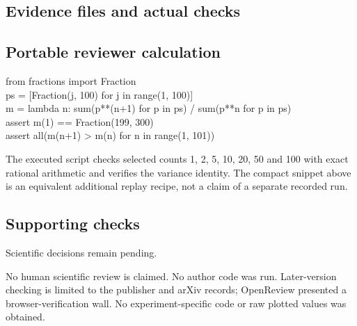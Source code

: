\documentclass[10pt]{article}
\begin{document}
\subsection*{Evidence files and actual checks}
\subsection*{Portable reviewer calculation}
{\ttfamily\footnotesize from fractions import Fraction\\
ps = [Fraction(j, 100) for j in range(1, 100)]\\
m = lambda n: sum(p**(n+1) for p in ps) / sum(p**n for p in ps)\\
assert m(1) == Fraction(199, 300)\\
assert all(m(n+1) > m(n) for n in range(1, 101))}\par
The executed script checks selected counts 1, 2, 5, 10, 20, 50 and 100 with exact rational arithmetic and verifies the variance identity. The compact snippet above is an equivalent additional replay recipe, not a claim of a separate recorded run.\par
\subsection*{Supporting checks}
Scientific decisions remain pending.\par
No human scientific review is claimed. No author code was run. Later-version checking is limited to the publisher and arXiv records; OpenReview presented a browser-verification wall. No experiment-specific code or raw plotted values was obtained.\par
\end{document}
